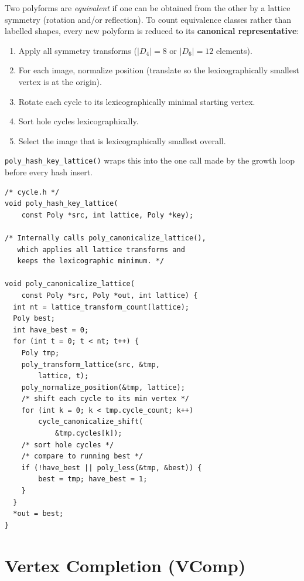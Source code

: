\documentclass[10pt,a4paper]{article}
\let\polysection\section
\renewcommand\section{\needspace{0.16\textheight}\polysection}
\newcommand{\code}[1]{\texttt{\small #1}}
\newcommand{\file}[1]{\texttt{\footnotesize #1}}
\begin{document}
\begin{tcolorbox}[dualbox, title=Canonical Form — \file{src/core/cycle.c\,/\,cycle.h}]
  Two polyforms are \emph{equivalent} if one can be obtained from the
  other by a lattice symmetry (rotation and/or reflection).  To count
  equivalence classes rather than labelled shapes, every new polyform
  is reduced to its \textbf{canonical representative}:

  \begin{enumerate}
    \item Apply all symmetry transforms ($|D_4|{=}8$ or
      $|D_6|{=}12$ elements).
    \item For each image, normalize position (translate so the
      lexicographically smallest vertex is at the origin).
    \item Rotate each cycle to its lexicographically minimal starting
      vertex.
    \item Sort hole cycles lexicographically.
    \item Select the image that is lexicographically smallest
      overall.
  \end{enumerate}

  \code{poly\_hash\_key\_lattice()} wraps this into the one call
  made by the growth loop before every hash insert.
\tcblower
\begin{verbatim}
/* cycle.h */
void poly_hash_key_lattice(
    const Poly *src, int lattice, Poly *key);

/* Internally calls poly_canonicalize_lattice(),
   which applies all lattice transforms and
   keeps the lexicographic minimum. */

void poly_canonicalize_lattice(
    const Poly *src, Poly *out, int lattice) {
  int nt = lattice_transform_count(lattice);
  Poly best;
  int have_best = 0;
  for (int t = 0; t < nt; t++) {
    Poly tmp;
    poly_transform_lattice(src, &tmp,
        lattice, t);
    poly_normalize_position(&tmp, lattice);
    /* shift each cycle to its min vertex */
    for (int k = 0; k < tmp.cycle_count; k++)
        cycle_canonicalize_shift(
            &tmp.cycles[k]);
    /* sort hole cycles */
    /* compare to running best */
    if (!have_best || poly_less(&tmp, &best)) {
        best = tmp; have_best = 1;
    }
  }
  *out = best;
}
\end{verbatim}
\end{tcolorbox}

\section{Vertex Completion (VComp)}
\end{document}

